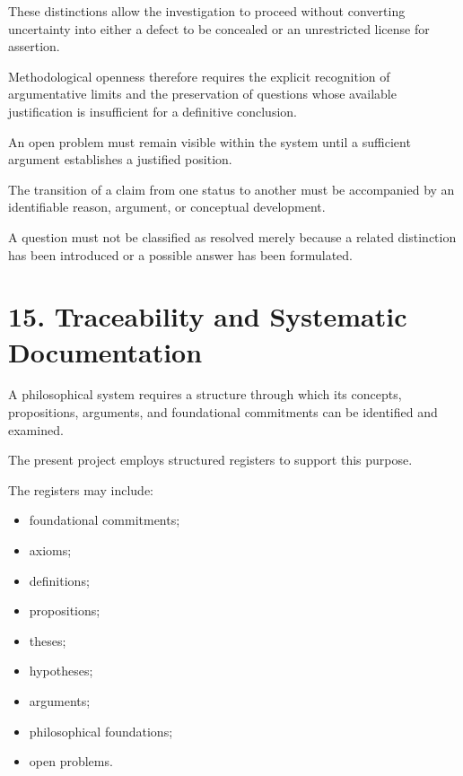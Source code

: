 These distinctions allow the
investigation to proceed without
converting uncertainty into
either a defect to be concealed
or an unrestricted license
for assertion.

Methodological openness therefore
requires the explicit recognition
of argumentative limits and
the preservation of questions
whose available justification
is insufficient for a definitive
conclusion.

An open problem must remain
visible within the system until
a sufficient argument establishes
a justified position.

The transition of a claim from
one status to another must
be accompanied by an identifiable
reason, argument, or conceptual
development.

A question must not be classified
as resolved merely because
a related distinction has been
introduced or a possible answer
has been formulated.


\section*{15. Traceability and Systematic Documentation}

A philosophical system requires
a structure through which its
concepts, propositions, arguments,
and foundational commitments
can be identified and examined.

The present project employs
structured registers to support
this purpose.

The registers may include:

\begin{itemize}

    \item foundational commitments;

    \item axioms;

    \item definitions;

    \item propositions;

    \item theses;

    \item hypotheses;

    \item arguments;

    \item philosophical foundations;

    \item open problems.

\end{itemize}

